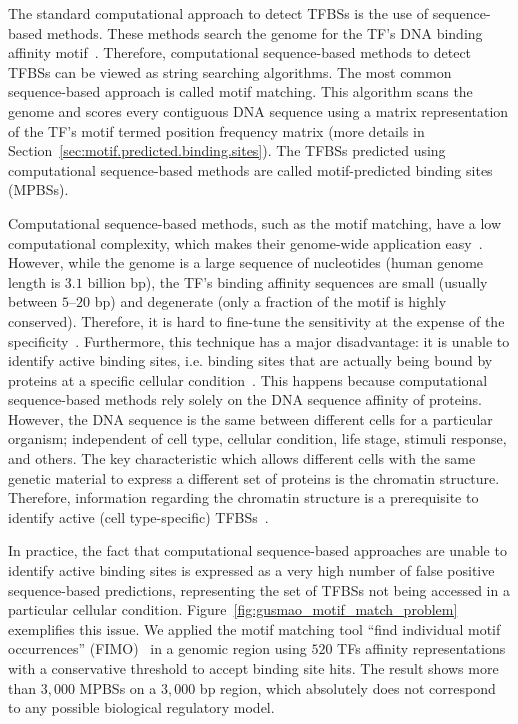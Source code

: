 The standard computational approach to detect TFBSs is the use of sequence-based methods. These methods search the genome for the TF's DNA binding affinity motif~\citep{stormo2000}. Therefore, computational sequence-based methods to detect TFBSs can be viewed as string searching algorithms. The most common sequence-based approach is called motif matching. This algorithm scans the genome and scores every contiguous DNA sequence using a matrix representation of the TF's motif termed position frequency matrix (more details in Section~\ref{sec:motif.predicted.binding.sites}). The TFBSs predicted using computational sequence-based methods are called motif-predicted binding sites (MPBSs).

Computational sequence-based methods, such as the motif matching, have a low computational complexity, which makes their genome-wide application easy~\citep{mathelier2013}. However, while the genome is a large sequence of nucleotides (human genome length is \approxy$3.1$ billion bp), the TF's binding affinity sequences are small (usually between $5$--$20$ bp) and degenerate (only a fraction of the motif is highly conserved). Therefore, it is hard to fine-tune the sensitivity at the expense of the specificity~\citep{stormo2000}. Furthermore, this technique has a major disadvantage: it is unable to identify active binding sites, i.e. binding sites that are actually being bound by proteins at a specific cellular condition~\citep{boyle2011}. This happens because computational sequence-based methods rely solely on the DNA sequence affinity of proteins. However, the DNA sequence is the same between different cells for a particular organism; independent of cell type, cellular condition, life stage, stimuli response, and others. The key characteristic which allows different cells with the same genetic material to express a different set of proteins is the chromatin structure. Therefore, information regarding the chromatin structure is a prerequisite to identify active (cell type-specific) TFBSs~\citep{arvey2012,thurman2012}.

In practice, the fact that computational sequence-based approaches are unable to identify active binding sites is expressed as a very high number of false positive sequence-based predictions, representing the set of TFBSs not being accessed in a particular cellular condition. Figure~\ref{fig:gusmao_motif_match_problem} exemplifies this issue. We applied the motif matching tool ``find individual motif occurrences'' (FIMO)~\citep{grant2011} in a genomic region using $520$ TFs affinity representations with a conservative threshold to accept binding site hits. The result shows more than $3,000$ MPBSs on a $3,000$ bp region, which absolutely does not correspond to any possible biological regulatory model.

